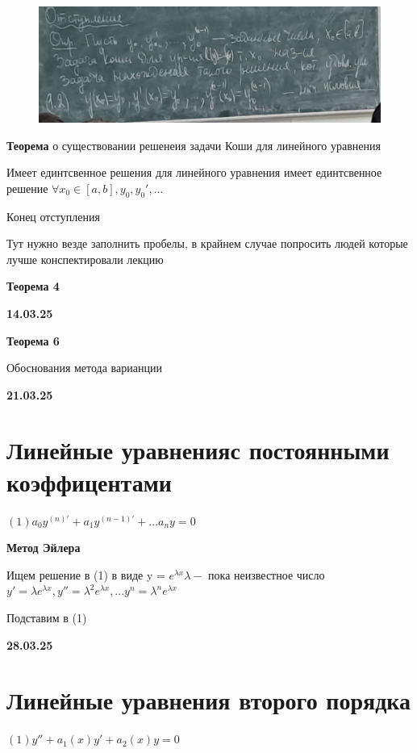 \documentclass{article}
\begin{document}
\begin{figure}[H]
    \centering
    \includegraphics[width=1\linewidth]{Снимок экрана 2025-03-07 103827.png}
\end{figure}


\textbf{Теорема} о существовании решенеия задачи Коши для линейного уравнения

Имеет единтсвенное решения для линейного уравнения имеет единтсвенное решение
$\forall x_0 \in [a,b], y_0, y_0',...$


Конец отступления


Тут нужно везде заполнить пробелы, в крайнем случае попросить людей которые лучше конспектировали лекцию


\textbf{Теорема 4}




\textbf{14.03.25}


\textbf{Теорема 6}


Обоснования метода варианции


\textbf{21.03.25}

\section{Линейные уравненияс постоянными коэффицентами}

$(1) a_0y^{(n)'} + a_1y^{(n-1)'}+ ... a_ny = 0 $

\textbf{Метод Эйлера}

Ищем решение в (1) в виде y = $e^{\lambda x}  \lambda - $ 
пока неизвестное число
$ y' = \lambda e^{\lambda x}, y'' = \lambda^2 e^{\lambda x}, ... y^n = \lambda^n e^{\lambda x}$

Подставим в (1)



\textbf{28.03.25}

\section{Линейные уравнения второго порядка}

$(1) y''+a_1(x)y'+a_2(x)y=0$
\end{document}
